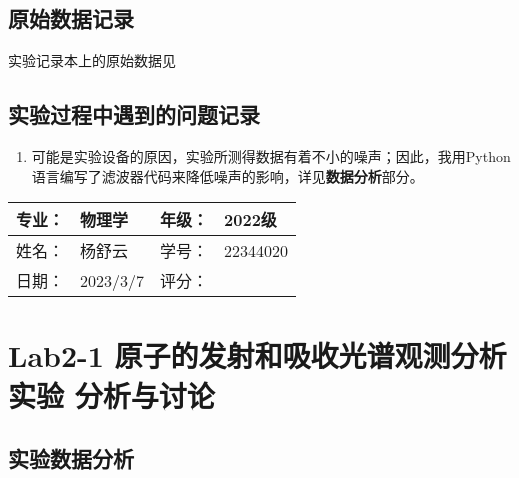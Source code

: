 \documentclass[dvipsnames, svgnames,a4paper,11pt]{article}
\begin{document}
	
	\clearpage
	\subsection{原始数据记录}
	实验记录本上的原始数据见%
	
	
	
	\subsection{实验过程中遇到的问题记录}
	\begin{enumerate}
		\item 可能是实验设备的原因，实验所测得数据有着不小的噪声；因此，我用Python语言编写了滤波器代码来降低噪声的影响，详见\textbf{数据分析}部分。
	\end{enumerate}
	
	
	
	\clearpage
	
	\begin{table}
		\renewcommand\arraystretch{1.7}
		\begin{tabularx}{\textwidth}{|X|X|X|X|}
			\hline
			专业：& 物理学 &年级：& 2022级\\
			\hline
			姓名： & 杨舒云 & 学号：& 22344020\\
			\hline
			日期：& 2023/3/7 & 评分：& \\
			\hline
		\end{tabularx}
	\end{table}
	
	\section{Lab2-1 原子的发射和吸收光谱观测分析实验 \quad\heiti 分析与讨论}
	
	\subsection{实验数据分析}
	
\end{document}
